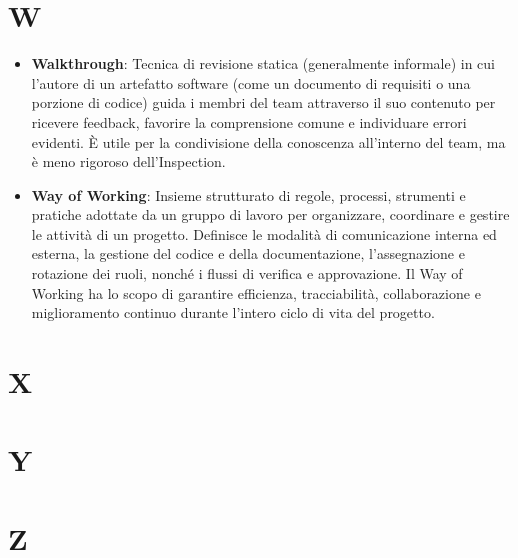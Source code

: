 \documentclass[11pt,a4paper]{article}
\begin{document}
\section*{W}
\begin{itemize}
\item \textbf{Walkthrough}: Tecnica di revisione statica (generalmente informale) in cui l'autore di un artefatto software (come un documento di requisiti o una porzione di codice) guida i membri del team attraverso il suo contenuto per ricevere feedback, favorire la comprensione comune e individuare errori evidenti. È utile per la condivisione della conoscenza all'interno del team, ma è meno rigoroso dell'Inspection.

\item \textbf{Way of Working}: Insieme strutturato di regole, processi, strumenti e pratiche adottate da un gruppo di lavoro per organizzare, coordinare e gestire le attività di un progetto. Definisce le modalità di comunicazione interna ed esterna, la gestione del codice e della documentazione, l’assegnazione e rotazione dei ruoli, nonché i flussi di verifica e approvazione. Il Way of Working ha lo scopo di garantire efficienza, tracciabilità, collaborazione e miglioramento continuo durante l’intero ciclo di vita del progetto.

\end{itemize}

\newpage

\section*{X}

\newpage

\section*{Y}

\newpage

\section*{Z}

\newpage
\end{document}
